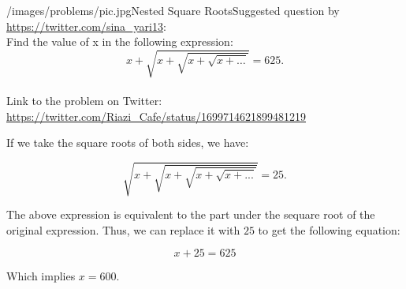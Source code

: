 \begin{problem}{/images/problems/pic.jpg}{Nested Square Roots}Suggested question by \url{https://twitter.com/sina_yari13}:\\[0.2cm]
	Find the value of x in the following expression: $$ x + \sqrt{x + \sqrt{x + \sqrt{x + \ldots}}} = 625. $$\\[0.2cm] Link to the problem on Twitter: \url{https://twitter.com/Riazi_Cafe/status/1699714621899481219}\end{problem}
\begin{solution}
If we take the square roots of both sides, we have:

$$
\sqrt{x + \sqrt{x + \sqrt{x + \sqrt{x + ...}}}} = 25.
$$

The above expression is equivalent to the part under the sequare root  of the original expression. Thus, we can replace it with $25$ to get the following equation:

$$
x + 25 = 625
$$

Which implies $x = 600$.
\end{solution}

